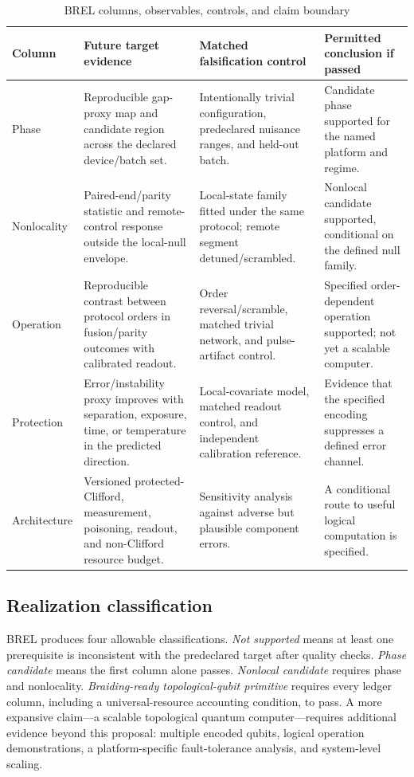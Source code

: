 \documentclass[conference]{IEEEtran}
\begin{document}
\begin{table}[t]
\caption{BREL columns, observables, controls, and claim boundary}
\label{tab:brel}
\centering
\footnotesize
\begin{tabular}{p{} p{} p{} p{}}
\toprule
\textbf{Column} & \textbf{Future target evidence} & \textbf{Matched falsification control} & \textbf{Permitted conclusion if passed}\\
\midrule
Phase & Reproducible gap-proxy map and candidate region across the declared device/batch set. & Intentionally trivial configuration, predeclared nuisance ranges, and held-out batch. & Candidate phase supported for the named platform and regime.\\
Nonlocality & Paired-end/parity statistic and remote-control response outside the local-null envelope. & Local-state family fitted under the same protocol; remote segment detuned/scrambled. & Nonlocal candidate supported, conditional on the defined null family.\\
Operation & Reproducible contrast between protocol orders in fusion/parity outcomes with calibrated readout. & Order reversal/scramble, matched trivial network, and pulse-artifact control. & Specified order-dependent operation supported; not yet a scalable computer.\\
Protection & Error/instability proxy improves with separation, exposure, time, or temperature in the predicted direction. & Local-covariate model, matched readout control, and independent calibration reference. & Evidence that the specified encoding suppresses a defined error channel.\\
Architecture & Versioned protected-Clifford, measurement, poisoning, readout, and non-Clifford resource budget. & Sensitivity analysis against adverse but plausible component errors. & A conditional route to useful logical computation is specified.\\
\bottomrule
\end{tabular}
\end{table}

\subsection{Realization classification}

BREL produces four allowable classifications. \emph{Not supported} means at least one prerequisite is inconsistent with the predeclared target after quality checks. \emph{Phase candidate} means the first column alone passes. \emph{Nonlocal candidate} requires phase and nonlocality. \emph{Braiding-ready topological-qubit primitive} requires every ledger column, including a universal-resource accounting condition, to pass. A more expansive claim---a scalable topological quantum computer---requires additional evidence beyond this proposal: multiple encoded qubits, logical operation demonstrations, a platform-specific fault-tolerance analysis, and system-level scaling.
\end{document}
